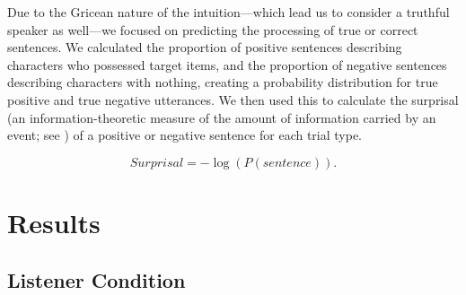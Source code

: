 \documentclass[man]{apa2}
\begin{document}
Due to the Gricean nature of the intuition---which lead us to consider a truthful speaker as well---we focused on predicting the processing of true or correct sentences.   We calculated the proportion of positive sentences describing characters who possessed target items, and the proportion of negative sentences describing characters with nothing, creating a probability distribution for true positive and true negative utterances.  We then used this to calculate the surprisal (an information-theoretic measure of the amount of information carried by an event; see \cite{levy2008}) of a positive or negative sentence for each trial type.  

\begin{equation}\label{eq:surprise}
Surprisal = -\log(P(sentence)).
\end{equation}


\section{Results}

\subsection{Listener Condition}
\end{document}
